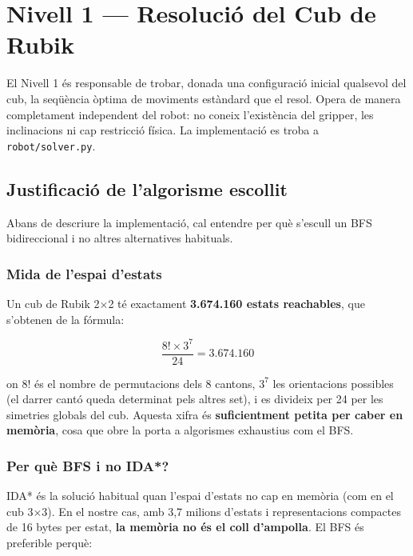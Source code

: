 \documentclass[12pt, a4paper]{article}
\begin{document}
\section{Nivell 1 — Resolució del Cub de Rubik}

El Nivell 1 és responsable de trobar, donada una configuració inicial qualsevol del cub, la seqüència òptima de moviments estàndard que el resol. Opera de manera completament independent del robot: no coneix l'existència del gripper, les inclinacions ni cap restricció física. La implementació es troba a \texttt{robot/solver.py}.

\subsection{Justificació de l'algorisme escollit}

Abans de descriure la implementació, cal entendre per què s'escull un BFS bidireccional i no altres alternatives habituals.

\subsubsection{Mida de l'espai d'estats}

Un cub de Rubik 2$\times$2 té exactament \textbf{3.674.160 estats reachables}, que s'obtenen de la fórmula:

\begin{equation*}
  \frac{8! \times 3^7}{24} = 3.674.160
\end{equation*}

on $8!$ és el nombre de permutacions dels 8 cantons, $3^7$ les orientacions possibles (el darrer cantó queda determinat pels altres set), i es divideix per 24 per les simetries globals del cub. Aquesta xifra és \textbf{suficientment petita per caber en memòria}, cosa que obre la porta a algorismes exhaustius com el BFS.

\subsubsection{Per què BFS i no IDA*?}

IDA* és la solució habitual quan l'espai d'estats no cap en memòria (com en el cub 3$\times$3). En el nostre cas, amb 3,7 milions d'estats i representacions compactes de 16 bytes per estat, \textbf{la memòria no és el coll d'ampolla}. El BFS és preferible perquè:
\end{document}
